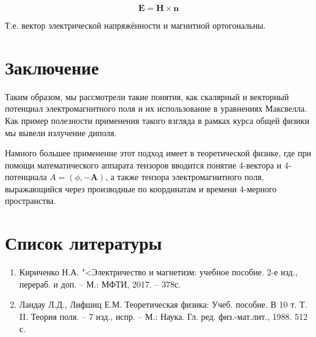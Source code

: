 \documentclass[12pt]{kiarticle}
\begin{document}
\begin{equation}\label{}
\mathbf{E} = \mathbf{H \times n}
\end{equation}

Т.е. вектор электрической напряжённости и магнитной ортогональны.


\section{Заключение}

Таким образом, мы рассмотрели такие понятия, как скалярный и векторный потенциал электромагнитного поля и их использование в уравнениях Максвелла. Как пример полезности применения такого взгляда в рамках курса общей физики мы вывели излучение диполя.

Намного большее применение этот подход имеет в теоретической физике, где при помощи математического аппарата тензоров вводится понятие 4-вектора и 4-потенциала $ A = (\phi, -\mathbf{A}) $, а также тензора электромагнитного поля, выражающийся через производные по координатам и времени 4-мерного пространства. 

\section*{Список литературы}

\begin{enumerate}
	
	\item Кириченко Н.А. "<Электричество и магнетизм: учебное пособие. 2-е изд., перераб. и доп. -- М.: МФТИ, 2017. -- 378с.
	
	\item Ландау Л.Д., Лифшиц Е.М. Теоретическая физика: Учеб. пособие. В 10 т. Т. II. Теория поля. -- 7 изд., испр. -- М.: Наука. Гл. ред. физ.-мат.лит., 1988. 512 с.
	
\end{enumerate}
\end{document}
